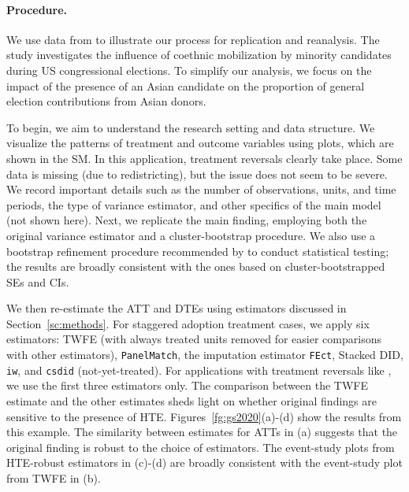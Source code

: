 \documentclass[12pt]{article}
\begin{document}
\paragraph*{Procedure.} We use data from \citet{Grumbach2020} to illustrate our process for replication and reanalysis. The study investigates the influence of coethnic mobilization by minority candidates during US congressional elections.
To simplify our analysis, we focus on the impact of the presence of an Asian candidate on the proportion of general election contributions from Asian donors.  

To begin, we aim to understand the research setting and data structure. We visualize the patterns of treatment and outcome variables using plots, which are shown in the SM. In this application, treatment reversals clearly take place. Some data is missing (due to redistricting), but the issue does not seem to be severe. We record important details such as the number of observations, units, and time periods, the type of variance estimator, and other specifics of the main model (not shown here). Next, we replicate the main finding, employing both the original variance estimator and a cluster-bootstrap procedure. We also use a bootstrap refinement procedure recommended by \citet{Cameron2008-ou} to conduct statistical testing; the results are broadly consistent with the ones based on cluster-bootstrapped SEs and CIs.  %

We then re-estimate the ATT and DTEs using estimators discussed in Section~\ref{sc:methods}. For staggered adoption treatment cases, we apply six estimators: TWFE (with always treated units removed for easier comparisons with other estimators), \texttt{PanelMatch}, the imputation estimator \texttt{FEct}, Stacked DID, \texttt{iw}, and \texttt{csdid} (not-yet-treated). For applications with treatment reversals like \citet{Grumbach2020}, we use the first three estimators only. The comparison between the TWFE estimate and the other estimates sheds light on whether original findings are sensitive to the presence of HTE. Figures~\ref{fg:gs2020}(a)-(d) show the results from this example. The similarity between estimates for ATTs in (a) suggests that the original finding is robust to the choice of estimators. The event-study plots from HTE-robust estimators in (c)-(d) are broadly consistent with the event-study plot from TWFE in (b).
\end{document}
